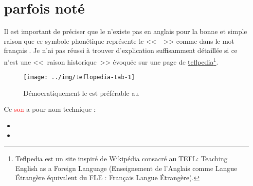 \section{  parfois noté  
  }\label{sec:sone}

Il est important de préciser que le  n'existe pas en anglais
pour la bonne et simple raison que ce symbole phonétique représente le
<<~~>> comme dans le mot français . Je n'ai pas réussi à
trouver d'explication suffisamment détaillée si ce n'est une <<~raison
historique~>> évoquée sur une page de
\href{http://teflpedia.com/IPA_phonetic_symbol_\%E3\%80\%9A\%C9\%9B\%E3\%80\%9B}{teflpedia}\footnote{Teflpedia
est un site inspiré de Wikipédia consacré au TEFL: Teaching English as
a Foreign Language (Enseignement de l'Anglais comme Langue \'Etrangère
équivalent du FLE : Français Langue \'Etrangère).}.

\begin{center}
  \begin{figure}[h]
    \centering
    \texttt{[image: ../img/teflopedia-tab-1]}
    \caption[Quel symbole phonétique pour le son "è"]{Démocratiquement
      le  est préférable au }
    \label{fig:teflpedia-1}
  \end{figure}
\end{center}

Ce \textcolor{red}{son} a pour nom technique :

\begin{itemize}
\item {}
\item {}
\end{itemize}

\indicsound


